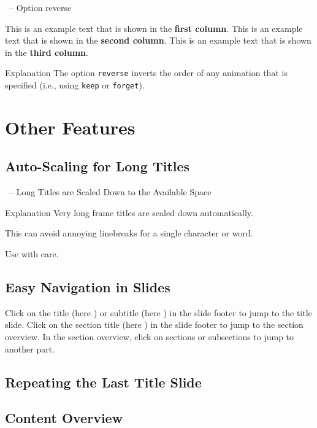 \documentclass[
	aspectratio=169, %
	8pt, %
]{beamer}
\begin{document}
\begin{frame}[label=current]{\insertsubsection\ -- Option reverse}
	\begin{fancycolumns}[columns=3,forget,reverse]
		This is an example text that is shown in the \textbf{first column}.
	\nextcolumn
		This is an example text that is shown in the \textbf{second column}.
	\nextcolumn
		This is an example text that is shown in the \textbf{third column}.
	\end{fancycolumns}
	\vfill
	\begin{info}{Explanation}
		The option \texttt{reverse} inverts the order of any animation that is specified (i.e., using \texttt{keep} or \texttt{forget}).
	\end{info}
\end{frame}

\section{Other Features}

\subsection{Auto-Scaling for Long Titles}
\begin{frame}{\insertsubsection\ -- Long Titles are Scaled Down to the Available Space}
	\begin{info}{Explanation}
		Very long frame titles are scaled down automatically.

		\hfill\hfill\hfill This can avoid annoying linebreaks for a single character or word.\hfill~

		\hfill Use with care.
	\end{info}
\end{frame}

\subsection{Easy Navigation in Slides}
\begin{frame}{\insertsubsection}
	\vfill
	Click on the title (here \textbf{\insertshorttitle}) or subtitle (here \textbf{\insertshortsubtitle}) in the slide footer to jump to the title slide.
	\vfill
	Click on the section title (here \textbf{\insertsection}) in the slide footer to jump to the section overview.
	\vfill
	In the section overview, click on sections or subsections to jump to another part.
	\vfill
\end{frame}

\subsection{Repeating the Last Title Slide}
\againtitle

\subsection{Content Overview}
\contentoverview[3] %
\end{document}
